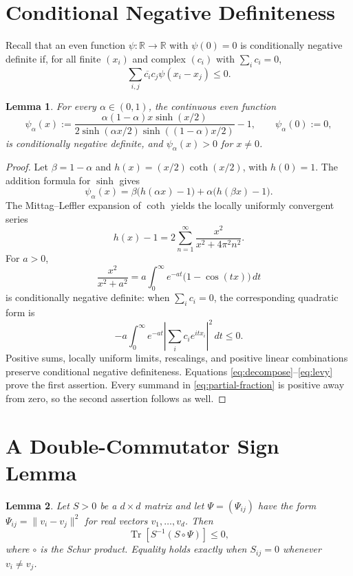 \documentclass[11pt]{article}
\newtheorem{lemma}{Lemma}
\newcommand{\R}{\mathbb R}
\newcommand{\Tr}{\operatorname{Tr}}
\begin{document}
\section*{Conditional Negative Definiteness}

Recall that an even function $\psi:\R\to\R$ with $\psi(0)=0$ is
conditionally negative definite if, for all finite $(x_i)$ and complex
$(c_i)$ with $\sum_i c_i=0$,
\[
 \sum_{i,j}\overline{c_i}c_j\psi(x_i-x_j)\leq0.
\]

\begin{lemma}\label{lem:cnd}
For every $\alpha\in(0,1)$, the continuous even function
\[
 \psi_\alpha(x):=
 \frac{\alpha(1-\alpha)x\sinh(x/2)}
 {2\sinh(\alpha x/2)\sinh((1-\alpha)x/2)}-1,
 \qquad \psi_\alpha(0):=0,
 \tag{4}\label{eq:psi}
\]
is conditionally negative definite, and
$\psi_\alpha(x)>0$ for $x\ne0$.
\end{lemma}

\begin{proof}
Let $\beta=1-\alpha$ and
$h(x)=(x/2)\coth(x/2)$, with $h(0)=1$.  The addition formula for
$\sinh$ gives
\[
 \psi_\alpha(x)
 =\beta\bigl(h(\alpha x)-1\bigr)
  +\alpha\bigl(h(\beta x)-1\bigr).
 \tag{5}\label{eq:decompose}
\]
The Mittag--Leffler expansion of $\coth$ yields the locally uniformly
convergent series
\[
 h(x)-1
 =2\sum_{n=1}^{\infty}
 \frac{x^2}{x^2+4\pi^2n^2}.
 \tag{6}\label{eq:partial-fraction}
\]
For $a>0$,
\[
 \frac{x^2}{x^2+a^2}
 =a\int_0^\infty e^{-at}\bigl(1-\cos(tx)\bigr)\,dt
 \tag{7}\label{eq:levy}
\]
is conditionally negative definite: when $\sum_i c_i=0$, the corresponding
quadratic form is
\[
 -a\int_0^\infty e^{-at}
 \left|\sum_i c_i e^{itx_i}\right|^2\,dt\leq0.
\]
Positive sums, locally uniform limits, rescalings, and positive linear
combinations preserve conditional negative definiteness.  Equations
\eqref{eq:decompose}--\eqref{eq:levy} prove the first assertion.
Every summand in \eqref{eq:partial-fraction} is positive away from zero, so
the second assertion follows as well.
\end{proof}

\section*{A Double-Commutator Sign Lemma}

\begin{lemma}\label{lem:trace}
Let $S>0$ be a $d\times d$ matrix and let
$\Psi=(\Psi_{ij})$ have the form
$\Psi_{ij}=\|v_i-v_j\|^2$ for real vectors $v_1,\ldots,v_d$.  Then
\[
 \Tr\!\left[S^{-1}(S\mathbin{\circ}\Psi)\right]\leq0,
 \tag{8}\label{eq:trace-sign}
\]
where $\circ$ is the Schur product.  Equality holds exactly when
$S_{ij}=0$ whenever $v_i\ne v_j$.
\end{lemma}
\end{document}
